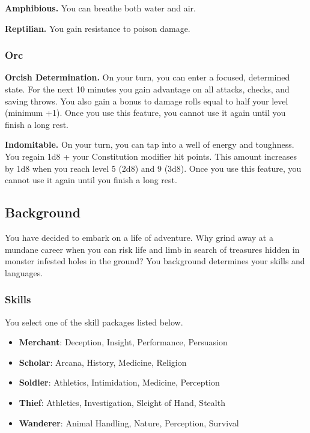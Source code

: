 \documentclass[12pt,letterpaper,twocolumn,openany,nodeprecatedcode,bg=none]{dndbook}
\providecommand{\tightlist}{%
  \setlength{\itemsep}{0pt}\setlength{\parskip}{0pt}}
\let\oldsubsection\subsection
\renewcommand{\subsection}[1]{%
  \needspace{5\baselineskip}%
  \oldsubsection{#1}%
}
\begin{document}
\textbf{Amphibious.} You can breathe both water and air.

\textbf{Reptilian.} You gain resistance to poison damage.

\subsubsection{Orc}\label{orc}

\textbf{Orcish Determination.} On your turn, you can enter a focused,
determined state. For the next 10 minutes you gain advantage on all
attacks, checks, and saving throws. You also gain a bonus to damage
rolls equal to half your level (minimum +1). Once you use this feature,
you cannot use it again until you finish a long rest.

\textbf{Indomitable.} On your turn, you can tap into a well of energy
and toughness. You regain 1d8 + your Constitution modifier hit points.
This amount increases by 1d8 when you reach level 5 (2d8) and 9 (3d8).
Once you use this feature, you cannot use it again until you finish a
long rest.

\subsection{Background}\label{background}

You have decided to embark on a life of adventure. Why grind away at a
mundane career when you can risk life and limb in search of treasures
hidden in monster infested holes in the ground? You background
determines your skills and languages.

\subsubsection{Skills}\label{skills}

You select one of the skill packages listed below.

\begin{itemize}
\tightlist
\item
  \textbf{Merchant}: Deception, Insight, Performance, Persuasion
\item
  \textbf{Scholar}: Arcana, History, Medicine, Religion
\item
  \textbf{Soldier}: Athletics, Intimidation, Medicine, Perception
\item
  \textbf{Thief}: Athletics, Investigation, Sleight of Hand, Stealth
\item
  \textbf{Wanderer}: Animal Handling, Nature, Perception, Survival
\end{itemize}
\end{document}
